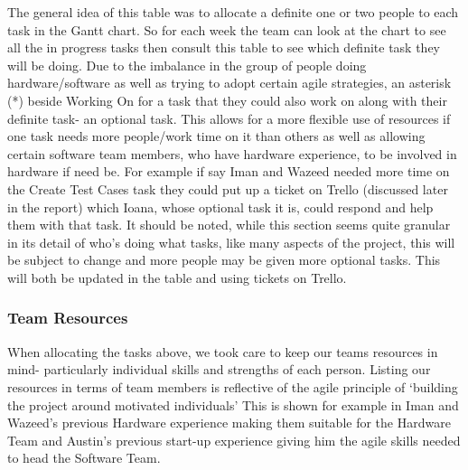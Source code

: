 \documentclass{article}
\begin{document}
The general idea of this table was to allocate a definite one or two people to each task in the Gantt chart. So for each week the team can look at the chart to see all the in progress tasks then consult this table to see which definite task they will be doing. 
\newline
Due to the imbalance in the group of people doing hardware/software as well as trying to adopt certain agile strategies, an asterisk (*) beside Working On for a task that they could also work on along with their definite task- an optional task. This allows for a more flexible use of resources if one task needs more people/work time on it than others as well as allowing certain software team members, who have hardware experience, to be involved in hardware if need be. For example if say Iman and Wazeed needed more time on the Create Test Cases task they could put up a ticket on Trello (discussed later in the report) which Ioana, whose optional task it is, could respond and help them with that task.  
\newline
It should be noted, while this section seems quite granular in its detail of who's doing what tasks, like many aspects of the project, this will be subject to change and more people may be given more optional tasks. This will both be updated in the table and using tickets on Trello. 
\subsubsection{Team Resources}
When allocating the tasks above, we took care to keep our teams resources in mind- particularly individual skills and strengths of each person. Listing our resources in terms of team members is reflective of the agile principle of ‘building the project around motivated individuals’ \cite{Agilemanifesto} This is shown for example in Iman and Wazeed’s previous Hardware experience making them suitable for the Hardware Team and Austin’s previous start-up experience giving him the agile skills needed to head the Software Team. 
\end{document}
